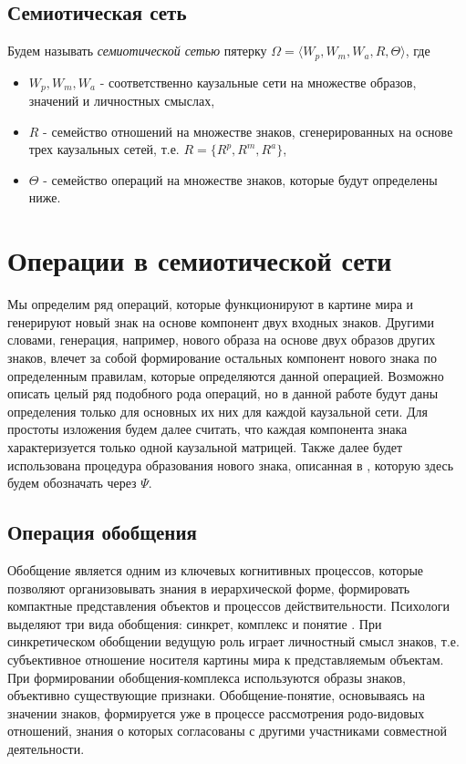 \documentclass[12pt]{scrartcl}
\begin{document}
	\subsection{Семиотическая сеть}
	Будем называть \textit{семиотической сетью} пятерку $\Omega=\langle W_p, W_m, W_a, R, \Theta \rangle$, где
	\begin{itemize}
		\item $W_p, W_m, W_a$ - соответственно каузальные сети на множестве образов, значений и личностных смыслах,
		\item $R$ - семейство отношений на множестве знаков, сгенерированных на основе трех каузальных сетей, т.е. $R=\{R^p, R^m, R^a\}$,
		\item $\Theta$ - семейство операций на множестве знаков, которые будут определены ниже.
	\end{itemize} 
	

	\section{Операции в семиотической сети}
	Мы определим ряд операций, которые функционируют в картине мира и генерируют новый знак на основе компонент двух входных знаков. Другими словами, генерация, например, нового образа на основе двух образов других знаков, влечет за собой формирование остальных компонент нового знака по определенным правилам, которые определяются данной операцией. Возможно описать целый ряд подобного рода операций, но в данной работе будут даны определения только для основных их них для каждой каузальной сети. Для простоты изложения будем далее считать, что каждая компонента знака характеризуется только одной каузальной матрицей. Также далее будет использована процедура образования нового знака, описанная в \cite{Osipov2014c}, которую здесь будем обозначать через $\Psi$.
	
	\subsection{Операция обобщения}
	
	Обобщение является одним из ключевых когнитивных процессов, которые позволяют организовывать знания в иерархической форме, формировать компактные представления объектов и процессов действительности. Психологи выделяют три вида обобщения: синкрет, комплекс и понятие \cite{Vygotsky1999}. При синкретическом обобщении ведущую роль играет личностный смысл знаков, т.е. субъективное отношение носителя картины мира к представляемым объектам. При формировании обобщения-комплекса используются образы знаков, объективно существующие признаки. Обобщение-понятие, основываясь на значении знаков, формируется уже в процессе рассмотрения родо-видовых отношений, знания о которых согласованы с другими участниками совместной деятельности.
	
\end{document}
